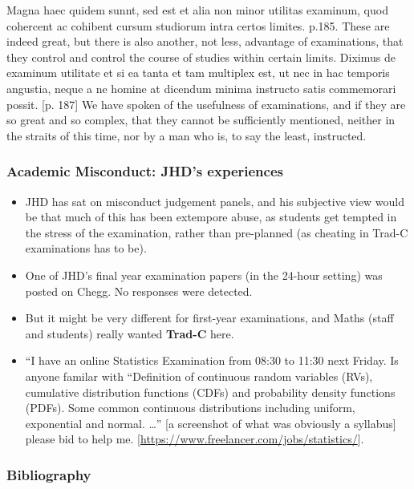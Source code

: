 Magna haec quidem sunnt, sed est et alia non minor utilitas examinum, quod cohercent ac cohibent cursum studiorum intra certos limites. p.185.
These are indeed great, but there is also another, not less, advantage of examinations, that they control and control the course of studies within certain limits.
Diximus de examinum utilitate et si ea tanta et tam multiplex est, ut nec in hac temporis angustia, neque a ne homine at dicendum minima instructo satis commemorari possit. [p. 187]
We have spoken of the usefulness of examinations, and if they are so great and so complex, that they cannot be sufficiently mentioned, neither in the straits of this time, nor by a man who is, to say the least, instructed.
\fi
\begin{frame}[fragile]
\frametitle{Academic Misconduct: JHD's experiences}
\pause
\begin{itemize}[<+->]
\item JHD has sat on misconduct judgement panels, and his subjective view would be that much of this has been extempore abuse, as students get tempted in the stress of the examination, rather than pre-planned (as cheating in Trad-C examinations has to be).
\item One of JHD's final year examination papers (in the 24-hour setting) was posted on Chegg. No responses were detected.
\item[\dbend]But it might be very different for first-year examinations, and Maths (staff and students) really wanted {\bf Trad-C} here.
\item ``I have an online Statistics Examination from 08:30 to 11:30 next Friday. Is anyone familar with ``Definition of continuous random variables (RVs), cumulative distribution functions (CDFs) and probability density functions (PDFs).
Some common continuous distributions including uniform, exponential and normal. \dots'' [a screenshot of what was obviously a syllabus] please bid to help me. [\url{https://www.freelancer.com/jobs/statistics/}].
\end{itemize}
\end{frame}

\begin{frame}[allowframebreaks]
\frametitle{Bibliography}

\end{frame}

